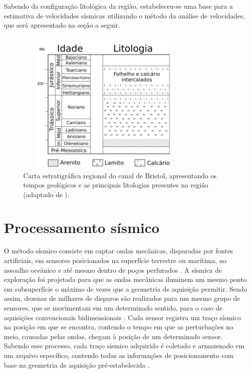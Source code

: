 \documentclass[
	12pt,				%
	openright,			%
	oneside,			%
	a4paper,			%
	english,			%
	brazil				%
	]{abntex2}
\begin{document}
	Sabendo da configuração litológica da região, estabeleceu-se uma base para a estimativa de velocidades sísmicas utilizando o método da análise de velocidades, que será apresentado na seção a seguir.

	\newpage		
    \begin{figure}[htp!]
		\centering
		\includegraphics[width=9cm,height=7.2cm]{../imagens/regional.png}
		\caption{Carta estratigráfica regional do canal de Bristol, apresentando os tempos geológicos e as principais litologias presentes na região (adaptado de ).}
		\label{estratos}
	\end{figure}

\section{Processamento sísmico}

    O método sísmico consiste em captar ondas mecânicas, disparadas por fontes artificiais, em sensores posicionados na superfície terrestre ou marítima, no assoalho oceânico e até mesmo dentro de poços perfurados \cite{kearey}. A sísmica de exploração foi projetada para que as ondas mecânicas iluminem um mesmo ponto em subsuperfície o máximo de vezes que a geometria de aquisição permitir. Sendo assim, dezenas de milhares de disparos são realizados para um mesmo grupo de sensores, que se movimentam em um determinado sentido, para o caso de aquisições convencionais bidimensionais \cite{sheriff1995exploration}. Cada sensor registra um traço sísmico na posição em que se encontra, contendo o tempo em que as perturbações no meio, causadas pelas ondas, chegam à posição de um determinado sensor. Sabendo esse processo, cada traço sísmico adquirido é coletado e armazenado em um arquivo específico, contendo todas as informações de posicionamento com base na geometria de aquisição pré-estabelecida \cite{aki2002quantitative}.
    
\end{document}
